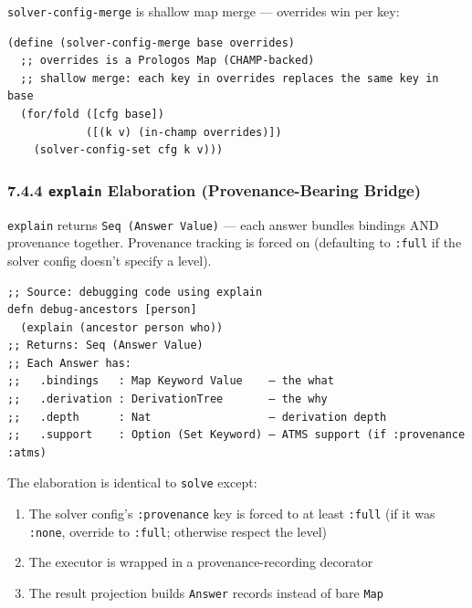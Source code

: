 \documentclass[11pt]{article}
\begin{document}
\texttt{solver-config-merge} is shallow map merge — overrides win per key:

\begin{verbatim}
(define (solver-config-merge base overrides)
  ;; overrides is a Prologos Map (CHAMP-backed)
  ;; shallow merge: each key in overrides replaces the same key in base
  (for/fold ([cfg base])
            ([(k v) (in-champ overrides)])
    (solver-config-set cfg k v)))
\end{verbatim}
\subsubsection{7.4.4 \texttt{explain} Elaboration (Provenance-Bearing Bridge)}
\label{sec:orgaf1c5ff}

\texttt{explain} returns \texttt{Seq (Answer Value)} — each answer bundles bindings AND
provenance together. Provenance tracking is forced on (defaulting to \texttt{:full}
if the solver config doesn't specify a level).

\begin{verbatim}
;; Source: debugging code using explain
defn debug-ancestors [person]
  (explain (ancestor person who))
;; Returns: Seq (Answer Value)
;; Each Answer has:
;;   .bindings   : Map Keyword Value    — the what
;;   .derivation : DerivationTree       — the why
;;   .depth      : Nat                  — derivation depth
;;   .support    : Option (Set Keyword) — ATMS support (if :provenance :atms)
\end{verbatim}

The elaboration is identical to \texttt{solve} except:

\begin{enumerate}
\item The solver config's \texttt{:provenance} key is forced to at least \texttt{:full}
(if it was \texttt{:none}, override to \texttt{:full}; otherwise respect the level)
\item The executor is wrapped in a provenance-recording decorator
\item The result projection builds \texttt{Answer} records instead of bare \texttt{Map}
\end{enumerate}
\end{document}
